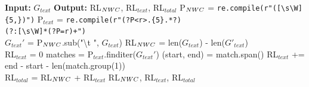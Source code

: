 \begin{algorithm}[ht]
\small
\caption{Repetition Detection (\alg)}
\label{alg:detect_repetitions}
\begin{algorithmic}[1]
\State \textbf{Input:} $G_{text}$ 
\State \textbf{Output:} RL$_{NWC}$, RL$_{text}$, RL$_{total}$ 
\State P$_{NWC}$ = \texttt{re.compile(r"([\textbackslash s\textbackslash W]\{5,\})")}  
\State P$_{text}$ = \texttt{re.compile(r"(?P<r>.\{5\}.*?)\\\hspace{2.5cm}(?:[\textbackslash s\textbackslash W]*(?P=r)+")} \\
    \State $G_{text}'$ = P$_{NWC}$.sub("\textbackslash t
", $G_{text}$)  
    \State RL$_{NWC}$ = len($G_{text}$) - len($G'_{text}$)  \\
    \State RL$_{text}$ = 0
    \State matches = P$_{text}$.finditer($G_{text}'$)
        \State (start, end) = match.span()
        \State RL$_{text}$ += end - start - len(match.group(1))  
    \EndFor\\
    RL$_{total}$ = RL$_{NWC}$ + RL$_{text}$
    \State \Return RL$_{NWC}$, RL$_{text}$, RL$_{total}$

\end{algorithmic}
\end{algorithm}
